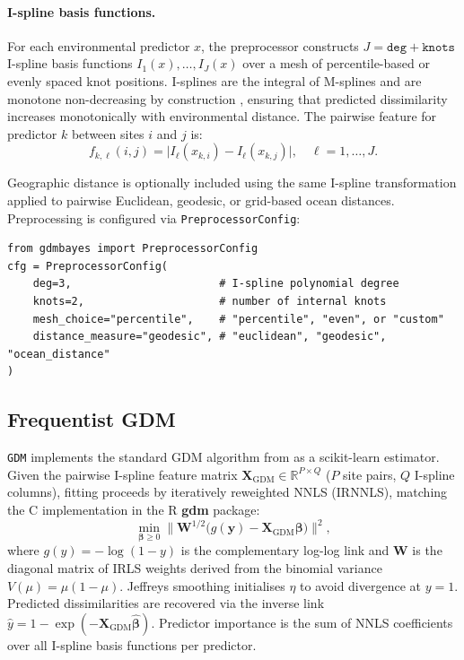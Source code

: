 \documentclass[12pt,a4paper]{article}
\begin{document}
\paragraph{I-spline basis functions.}
For each environmental predictor $x$, the preprocessor constructs
$J = \texttt{deg} + \texttt{knots}$ I-spline basis functions
$I_1(x), \ldots, I_J(x)$ over a mesh of percentile-based or evenly spaced
knot positions. I-splines are the integral of M-splines and are monotone
non-decreasing by construction \citep{ramsay1988}, ensuring that predicted
dissimilarity increases monotonically with environmental distance. The pairwise
feature for predictor $k$ between sites $i$ and $j$ is:
\begin{equation}
  f_{k,\ell}(i,j) = \bigl|I_\ell(x_{k,i}) - I_\ell(x_{k,j})\bigr|,
  \quad \ell = 1, \ldots, J.
  \label{eq:ispline-feature}
\end{equation}

Geographic distance is optionally included using the same I-spline
transformation applied to pairwise Euclidean, geodesic, or grid-based ocean
distances. Preprocessing is configured via \texttt{PreprocessorConfig}:
\begin{lstlisting}[style=python]
from gdmbayes import PreprocessorConfig
cfg = PreprocessorConfig(
    deg=3,                       # I-spline polynomial degree
    knots=2,                     # number of internal knots
    mesh_choice="percentile",    # "percentile", "even", or "custom"
    distance_measure="geodesic", # "euclidean", "geodesic", "ocean_distance"
)
\end{lstlisting}

\subsection{Frequentist GDM}\label{sec:freq}

\texttt{GDM} implements the standard GDM algorithm from \citet{ferrier2007}
as a scikit-learn estimator. Given the pairwise I-spline feature matrix
$\mathbf{X}_{\mathrm{GDM}} \in \mathbb{R}^{P \times Q}$ ($P$ site pairs,
$Q$ I-spline columns), fitting proceeds by iteratively reweighted NNLS
(IRNNLS), matching the C implementation in the R \textbf{gdm} package:
\begin{equation}
  \min_{\boldsymbol{\beta} \geq 0}
  \bigl\|\mathbf{W}^{1/2}
  \bigl(g(\mathbf{y}) - \mathbf{X}_{\mathrm{GDM}}\boldsymbol{\beta}\bigr)
  \bigr\|^2,
  \label{eq:nnls}
\end{equation}
where $g(y) = -\log(1-y)$ is the complementary log-log link and $\mathbf{W}$
is the diagonal matrix of IRLS weights derived from the binomial variance
$V(\mu) = \mu(1-\mu)$. Jeffreys smoothing initialises $\eta$ to avoid
divergence at $y = 1$. Predicted dissimilarities are recovered via the inverse
link $\hat{y} = 1 - \exp(-\mathbf{X}_{\mathrm{GDM}}\hat{\boldsymbol{\beta}})$.
Predictor importance is the sum of NNLS coefficients over all I-spline basis
functions per predictor.
\end{document}
